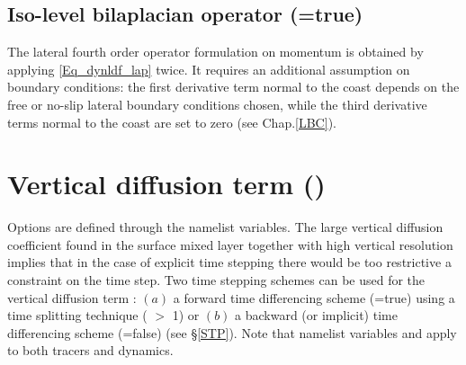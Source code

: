 \subsection   [Iso-level bilaplacian operator (\np{ln\_dynldf\_bilap})]
			{Iso-level bilaplacian operator (=true)}
\label{DYN_ldf_bilap}

The lateral fourth order operator formulation on momentum is obtained by 
applying \eqref{Eq_dynldf_lap} twice. It requires an additional assumption on 
boundary conditions: the first derivative term normal to the coast depends on 
the free or no-slip lateral boundary conditions chosen, while the third 
derivative terms normal to the coast are set to zero (see Chap.\ref{LBC}).

\section  [Vertical diffusion term (\mdl{dynzdf})]
		{Vertical diffusion term ()}
\label{DYN_zdf}

Options are defined through the  namelist variables.
The large vertical diffusion coefficient found in the surface mixed layer together 
with high vertical resolution implies that in the case of explicit time stepping there 
would be too restrictive a constraint on the time step. Two time stepping schemes 
can be used for the vertical diffusion term : $(a)$ a forward time differencing 
scheme (=true) using a time splitting technique 
( $>$ 1) or $(b)$ a backward (or implicit) time differencing scheme 
(=false) (see \S\ref{STP}). Note that namelist variables 
 and  apply to both tracers and dynamics. 

